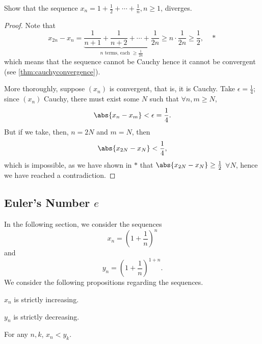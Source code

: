 \documentclass[12pt]{article}
\begin{document}
\begin{example}
  Show that the sequence $x_n = 1 + \frac{1}{2} + \cdots + \frac{1}{n}, n \geq 1$, diverges.
  \begin{proof}
    Note that \[
    x_{2n} - x_n = \underbrace{\frac{1}{n+1} + \frac{1}{n+2} + \cdots + \frac{1}{2n}}_{n \text{ terms, each } \geq \frac{1}{2n}} \geq n \cdot \frac{1}{2n} \geq \frac{1}{2}, \quad \ast
    \]
    which means that the sequence cannot be Cauchy hence it cannot be convergent (see \cref{thm:cauchyconvergence}). 
    
    More thoroughly, suppose $(x_n)$ is convergent, that is, it is Cauchy. Take $\epsilon  = \frac{1}{4}$; since $(x_n)$ Cauchy, there must exist some $N$ such that $\forall n,m \geq N$, \[\abs{x_{n} - x_m} < \epsilon = \frac{1}{4}.\] But if we take, then, $n = 2N$ and $m = N$, then \[
      \abs{x_{2N} - x_N} < \frac{1}{4},
    \]
    which is impossible, as we have shown in $\ast$ that $\abs{x_{2N} - x_N} \geq \frac{1}{2}$ $\forall N$, hence we have reached a contradiction.
  \end{proof}
\end{example}


\subsection{Euler's Number \texorpdfstring{$e$}{e}}

\begin{remark}
  In the following section, we consider the sequences \[
  x_n = \left(1 + \frac{1}{n}\right)^n
  \]
  and \[
  y_n = \left(1 + \frac{1}{n}\right)^{1+n}.
  \]
  We consider the following propositions regarding the sequences.
\end{remark}

\begin{proposition}[Step 1]\label{prop:eulerstep1}
  $x_n$ is strictly increasing. \footnotemark
\end{proposition}

\begin{proposition}[Step 2]\label{prop:eulerstep2}
  $y_n$ is strictly decreasing.\footnotemark
\end{proposition}

\begin{proposition}[Step 3]\label{prop:eulerstep3}
  For any $n,k$, $x_n < y_k$. \footnotemark
\end{proposition}
\end{document}

